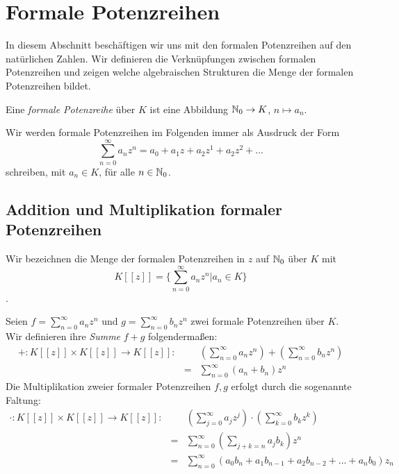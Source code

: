 \section{Formale Potenzreihen}\label{potenzreihenring}

%
In diesem Abschnitt beschäftigen wir uns mit den formalen Potenzreihen auf den natürlichen Zahlen. Wir definieren die Verknüpfungen zwischen formalen Potenzreihen und zeigen welche algebraischen Strukturen die Menge der formalen Potenzreihen bildet.
  
\begin{defn}
Eine \textit{formale Potenzreihe} über $K$ ist eine Abbildung $\mathbb{N}_0 \rightarrow K$, $n \mapsto a_n$.
\end{defn}
\begin{bem}
Wir werden formale Potenzreihen im Folgenden immer als Ausdruck der Form
\begin{equation}\label{eq: formalepotenzreihe}
\sum_{n=0}^\infty a_n z^n = a_0 + a_1z + a_2z^1 + a_2z^2 + ...
\end{equation}
schreiben, mit $a_n \in K$, für alle $n \in \mathbb{N}_0$.
\end{bem}
%
%
%
\subsection{Addition und Multiplikation formaler Potenzreihen} \label{Rechnen}
Wir bezeichnen die Menge der formalen Potenzreihen in $z$ auf $\mathbb{N}_0$ über $K$ mit \[K [[z]] = \lbrace \sum_{n=0}^\infty a_n z^n \vert a_n\in K \rbrace \].
%
%
%
%
\begin{defn}\label{AdditionMultiplikationPotenzreihen}
%
Seien $f = \sum_{n=0}^\infty a_n z^n$ und $g = \sum_{n=0}^\infty b_n z^n$ zwei formale Potenzreihen über $K$. Wir definieren ihre \textit{Summe} $f+g$ folgendermaßen:
\begin{eqnarray*}
+ \colon K [[z]] \times K [[z]] \to K[[z]]:&&\left( \sum_{n=0}^\infty a_n z^n \right) + \left( \sum_{n=0}^\infty b_n z^n \right) \\
&=& \sum_{n=0}^{\infty} (a_n + b_n) z^n 
\end{eqnarray*}
%
%
% 
%
%
Die Multiplikation zweier formaler Potenzreihen $f,g$ erfolgt durch die sogenannte Faltung:
\begin{eqnarray*}
\cdot\colon  K [[z]] \times K [[z]] \to K[[z]]:&& \left( \sum_{j=0}^\infty a_j z^j \right)\cdot \left( \sum_{k=0}^\infty b_k z^k \right) \\
&=& \sum_{n=0}^\infty \left(\sum_{j+k=n} a_j b_k\right) z^n \\
&=& \sum_{n= 0}^\infty \left(a_0b_n + a_1b_{n-1} + a_2b_{n-2} + ... + a_nb_0 \right)z_n
\end{eqnarray*}
\end{defn}
%
\vspace{0.8cm}
%
%
%
% 
